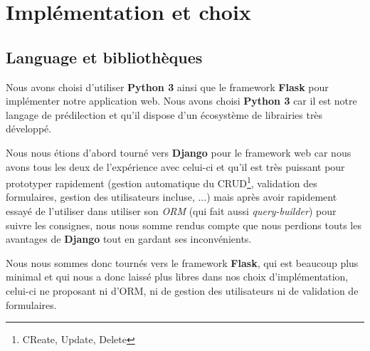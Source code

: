 \documentclass[10pt,a4paper]{article}
\begin{document}
\section{Implémentation et choix}
\subsection{Language et bibliothèques}

Nous avons choisi d'utiliser \textbf{Python 3} ainsi que le framework \textbf{Flask} pour implémenter notre application web. Nous avons choisi \textbf{Python 3} car il est notre langage de prédilection et qu'il dispose d'un écosystème de librairies très développé.

Nous nous étions d'abord tourné vers \textbf{Django} pour le framework web car nous avons tous les deux de l'expérience avec celui-ci et qu'il est très puissant pour prototyper rapidement (gestion automatique du CRUD\footnote{CReate, Update, Delete}, validation des formulaires, gestion des utilisateurs incluse, ...) mais après avoir rapidement essayé de l'utiliser dans utiliser son \textit{ORM} (qui fait aussi \textit{query-builder}) pour suivre les consignes, nous nous somme rendus compte que nous perdions touts les avantages de \textbf{Django} tout en gardant ses inconvénients.

Nous nous sommes donc tournés vers le framework \textbf{Flask}, qui est beaucoup plus minimal et qui nous a donc laissé plus libres dans nos choix d'implémentation, celui-ci ne proposant ni d'ORM, ni de gestion des utilisateurs ni de validation de formulaires.
\end{document}

